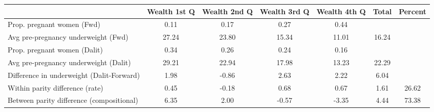 \begin{tabular}{l*{6}{c}}
\toprule
            &\multicolumn{1}{c}{Wealth 1st Q}&\multicolumn{1}{c}{Wealth 2nd Q}&\multicolumn{1}{c}{Wealth 3rd Q}&\multicolumn{1}{c}{Wealth 4th Q}&\multicolumn{1}{c}{Total}&\multicolumn{1}{c}{Percent}\\
\midrule
\midrule
Prop. pregnant women (Fwd)&        0.11&        0.17&        0.27&        0.44&            &            \\
Avg pre-pregnancy underweight (Fwd)&       27.24&       23.80&       15.34&       11.01&       16.24&            \\
Prop. pregnant women (Dalit)&        0.34&        0.26&        0.24&        0.16&            &            \\
Avg pre-pregnancy underweight (Dalit)&       29.21&       22.94&       17.98&       13.23&       22.29&            \\
Difference in underweight (Dalit-Forward)&        1.98&       -0.86&        2.63&        2.22&        6.04&            \\
Within parity difference (rate)&        0.45&       -0.18&        0.68&        0.67&        1.61&       26.62\\
Between parity difference (compositional)&        6.35&        2.00&       -0.57&       -3.35&        4.44&       73.38\\
\bottomrule
\end{tabular}
